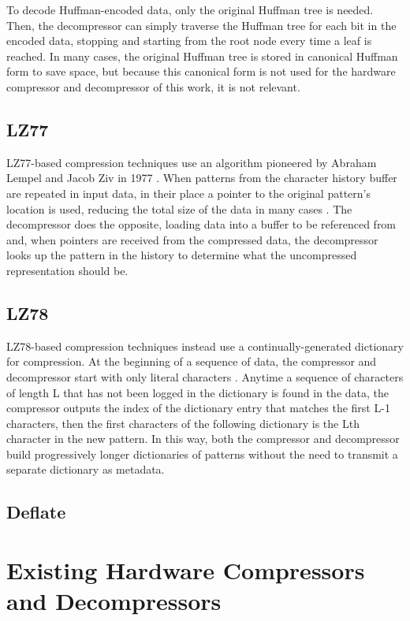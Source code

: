\documentclass[doublespace,draft,nopageskip]{VTthesis} %
\begin{document}
To decode Huffman-encoded data, only the original Huffman tree is needed. Then, the decompressor can simply traverse the Huffman tree for each bit in the encoded data, stopping and starting from the root node every time a leaf is reached. In many cases, the original Huffman tree is stored in canonical Huffman form to save space, but because this canonical form is not used for the hardware compressor and decompressor of this work, it is not relevant.

\subsection{LZ77}\label{ss:lz77}
LZ77-based compression techniques use an algorithm pioneered by Abraham Lempel and Jacob Ziv in 1977 \cite{lz77}. When patterns from the character history buffer are repeated in input data, in their place a pointer to the original pattern's location is used, reducing the total size of the data in many cases \cite{lz77}. The decompressor does the opposite, loading data into a buffer to be referenced from and, when pointers are received from the compressed data, the decompressor looks up the pattern in the history to determine what the uncompressed representation should be.

\subsection{LZ78}\label{ss:lz78}
LZ78-based compression techniques instead use a continually-generated dictionary for compression. At the beginning of a sequence of data, the compressor and decompressor start with only literal characters \cite{lz78}. Anytime a sequence of characters of length L that has not been logged in the dictionary is found in the data, the compressor outputs the index of the dictionary entry that matches the first L-1 characters, then the first characters of the following dictionary is the Lth character in the new pattern. In this way, both the compressor and decompressor build progressively longer dictionaries of patterns without the need to transmit a separate dictionary as metadata.

\subsection{Deflate}\label{ss:deflate}


\section{Existing Hardware Compressors and Decompressors}\label{se:existing_hardware_compressors_and_decompressors}
\end{document}
